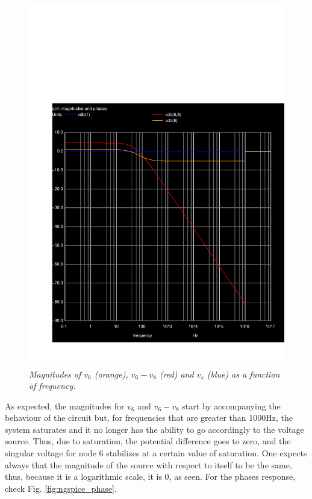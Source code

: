 \vspace{-13mm}
\begin{figure}[H]
    \centering
    \includegraphics[width = 0.85\linewidth]{../sim/voltage_mag.pdf}
        \caption{\textit{Magnitudes of $v_6$ (orange), $v_6 - v_8$ (red) and $v_s$ (blue) as a function of frequency.}}
    \label{fig:magnitude_spice}
\end{figure}

As expected, the magnitudes for $v_6$ and $v_6 - v_8$ start by accompanying the behaviour of the circuit but, for frequencies that are greater than 1000Hz, the system saturates and it no longer has the ability to go accordingly to the voltage source. Thus, due to saturation, the potential difference goes to zero, and the singular voltage for node 6 stabilizes at a certain value of saturation. One expects always that the magnitude of the source with respect to itself to be the same, thus, because it is a logarithmic scale, it is 0, as seen. For the phases response, check Fig. \ref{fig:ngspice_phase}.

